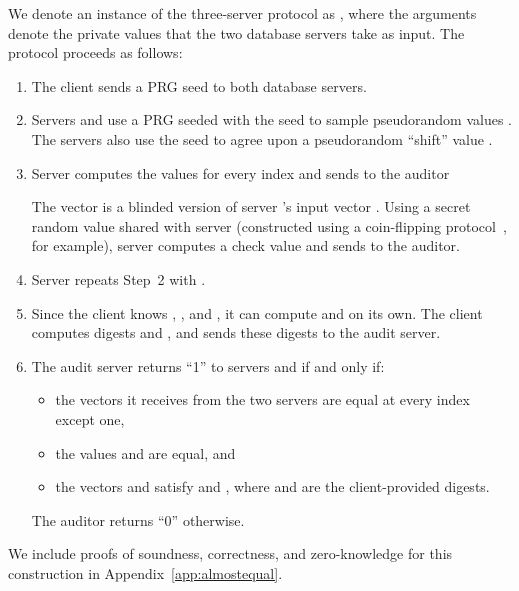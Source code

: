 \documentclass[10pt,twocolumn]{article}
\begin{document}
We denote an instance of the three-server
protocol as ,
where the arguments denote the private values that 
the two database servers take as input.
The protocol proceeds as follows:
\begin{enumerate}
  \item The client sends a PRG seed  to both database servers.

  \item Servers  and  use a PRG seeded with the seed 
        to sample  pseudorandom values . 
        The servers also use the seed  to agree upon
        a pseudorandom ``shift'' value .
        
  \item Server  computes the values 
        for every index  and 
        sends to the auditor
         
        The vector  is a blinded version of server 's input vector .
        Using a secret random value  shared with server 
        (constructed using a coin-flipping protocol~\cite{blum1983coin}, for example),
        server  computes a check value
         and sends  to the auditor.

  \item Server  repeats Step~2 with .

  \item \label{step:clientsend}
        Since the client knows , , and , it can 
        compute  and  on its own.
        The client computes digests 
         and ,
        and sends these digests to the audit server.

  \item The audit server returns ``1'' to servers  and 
        if and only if:
        \begin{itemize}
          \item the vectors it receives from the two
                servers are equal at every index except one, 
          \item the values  and  are equal, and
          \item the vectors  and  satisfy
                 and ,
                where  and  are the client-provided digests. 
        \end{itemize}
        The auditor returns ``0'' otherwise.
        
\end{enumerate}



We include proofs of soundness, correctness, and zero-knowledge
for this construction in Appendix~\ref{app:almostequal}.
\end{document}
